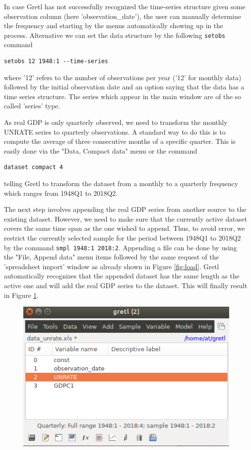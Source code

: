 \documentclass[11pt]{article}
\begin{document}
In case Gretl has not successfully recognized the time-series structure given some observation column (here 'observation\_date'), the user can manually determine the frequency and starting by the menus automatically showing up in the process. Alternative we can set the data structure by the following \texttt{setobs} command
\begin{verbatim}
setobs 12 1948:1 --time-series
\end{verbatim}
where '12' refers to the number of observations per year ('12' for monthly data) followed by the initial observation date and an option saying that the data has a time series structure. The series which appear in the main window are of the so called 'series' type.

As real GDP is only quarterly observed, we need to transform the monthly UNRATE series to quarterly observations. A standard way to do this is to compute the average of three consecutive months of a specific quarter. This is easily done via the "Data, Compact data" menu or the command
\begin{verbatim}
dataset compact 4
\end{verbatim}
telling Gretl to transform the dataset from a monthly to a quarterly frequency which ranges from 1948Q1 to 2018Q2.

The next step involves appending the real GDP series from another source to the existing dataset. However, we need to make sure that the currently active dataset covers the same time span as the one wished to append. Thus, to avoid error, we restrict the currently selected sample for the period between 1948Q1 to 2018Q2 by the command \texttt{smpl 1948:1 2018:2}. Appending a file can be done by using the "File, Append data" menu items followed by the same request of the 'spreadsheet import' window as already shown in Figure \ref{fig:load}. Gretl automatically recognizes that the appended dataset has the same length as the active one and will add the real GDP series to the dataset. This will finally result in Figure \ref{fig:append}.

\begin{figure}[!h]
	\centering
	\includegraphics[width=.42\textwidth]{../figures/gretl_after_appending}
	\caption{}
	\label{fig:append}
\end{figure}
\end{document}

